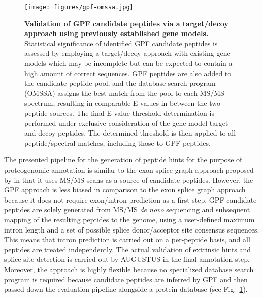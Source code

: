 \begin{figure}
\texttt{[image: figures/gpf-omssa.jpg]}
\caption{
{\bf Validation of GPF candidate peptides via a target/decoy approach
    using previously established gene models.} 
    Statistical significance of identified GPF candidate peptides is 
    assessed by employing a target/decoy approach with existing gene models 
    which may be incomplete but can be expected to contain a high amount of 
    correct sequences.
    GPF peptides are also added to the candidate peptide pool, and the database
    search program (OMSSA) assigns the best match from the pool to each
    MS/MS spectrum, resulting in comparable E-values in between the two
    peptide sources.
    The final E-value threshold determination is performed under exclusive
    consideration of the gene model target and decoy peptides.
    The determined threshold is then applied to all peptide/spectral matches,
    including those to GPF peptides.
}
\label{fig:gpf-omssa}
\end{figure}

The presented pipeline for the generation of peptide hints for the purpose of
proteogenomic annotation is similar to the exon splice graph approach proposed
by \citeauthor{Tanner2007} in that it uses MS/MS scans as a source of candidate
peptides.
However, the GPF approach is less biased in comparison to the exon splice graph
approach because it does not require exon/intron prediction as a first step.
GPF candidate peptides are solely generated from MS/MS {\em de novo} sequencing
and subsequent mapping of the resulting peptides to the genome, using a 
user-defined maximum intron length and a set of possible splice donor/acceptor 
site consensus sequences.
This means that intron prediction is carried out on a per-peptide basis, and
all peptides are treated independently.
The actual validation of extrinsic hints and splice site detection is
carried out by AUGUSTUS in the final annotation step.
Moreover, the approach is highly flexible because no specialized database
search program is required because candidate peptides are inferred by GPF
and then passed down the evaluation pipeline alongside a protein database
(see Fig.~\ref{fig:gpf-omssa}).


